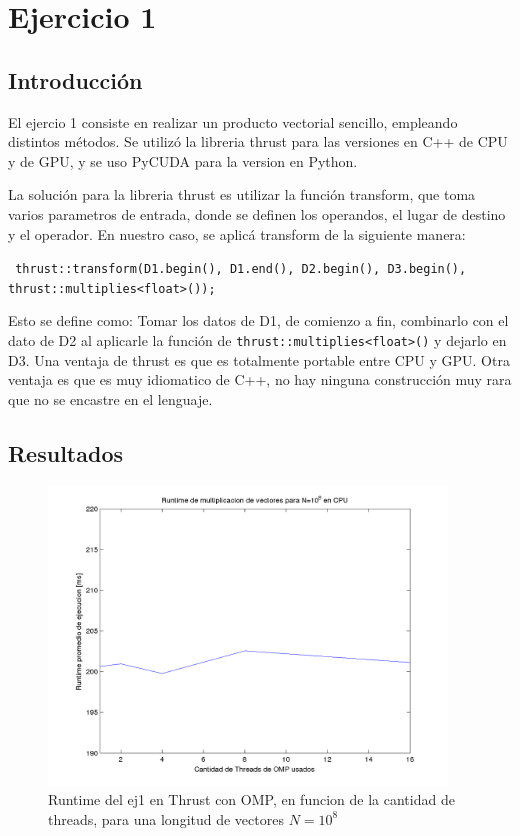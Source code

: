 \section{Ejercicio 1}

\subsection{Introducci\'on}
El ejercio 1 consiste en realizar un producto vectorial sencillo, empleando distintos m\'etodos.
Se utiliz\'o la libreria thrust para las versiones en C++ de CPU y de GPU, y se uso PyCUDA para
la version en Python.

La soluci\'on para la libreria thrust es utilizar la funci\'on transform, que toma varios parametros
de entrada, donde se definen los operandos, el lugar de destino y el operador. En nuestro caso,
se aplic\'a transform de la siguiente manera:

\small{\texttt{
    thrust::transform(D1.begin(), D1.end(), D2.begin(), D3.begin(),\\
                       thrust::multiplies<float>());
               }}

Esto se define como: Tomar los datos de D1, de comienzo a fin, combinarlo con el dato de D2 al aplicarle la funci\'on 
de \texttt{thrust::multiplies<float>()} y dejarlo en D3. Una ventaja de thrust es que es totalmente 
portable entre CPU y GPU. Otra ventaja es que es muy idiomatico de C++, no hay ninguna construcci\'on muy rara
que no se encastre en el lenguaje. 


\subsection{Resultados}
\def \hrwidth {300pt}


  \begin{figure}[H]
 \begin {center}
 \includegraphics[width=\hrwidth]{plots/ej1omp.png}
 \end {center}
 \caption{Runtime del ej1 en Thrust con OMP, en funcion de la cantidad de threads, para una longitud de vectores $N=10^8$}
 \label{fig:ej1OMP}
 \end{figure}

